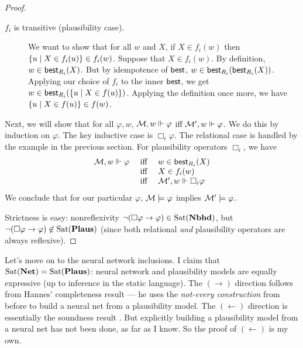 \documentclass[letterpaper]{article}
\begin{document}
\begin{proof}
\begin{description}
        \item[$f_i$ is transitive (plausibility case).]
        We want to show that for all $w$ and $X$, if $X \in f_i(w)$ then $\{ u \mid X \in f_i(u) \} \in f_i(w)$.  Suppose that $X \in f_i(w)$.  By definition, $w \in \mathsf{best}_{R_i}(X)$.  But by idempotence of $\mathsf{best}$, $w \in \mathsf{best}_{R_i}(\mathsf{best}_{R_i}(X))$.  Applying our choice of $f_i$ to the inner $\mathsf{best}$, we get $w \in \mathsf{best}_{R_i}(\{ u \mid X \in f(u) \})$.  Applying the definition once more, we have $\{ u \mid X \in f(u) \} \in f(w)$.

    \end{description}

    Next, we will show that for all $\varphi, w$, $\mathcal{M}, w \Vdash \varphi$ iff $\mathcal{M}', w \Vdash \varphi$.  We do this by induction on $\varphi$.  The key inductive case is $\Box_i \varphi$.  The relational case is handled by the example in the previous section.  For plausibility operators $\Box_i$, we have
    \[
    \begin{array}{lcl}
        \mathcal{M}, w \Vdash \varphi & \mbox{ iff } & w \in \mathsf{best}_{R_i}(X) \\
        & \mbox{ iff } & X \in f_i(w) \\
        & \mbox{ iff } & \mathcal{M}', w \Vdash \Box_i \varphi
    \end{array}
    \]
    We conclude that for our particular $\varphi$, $\mathcal{M} \models \varphi$ implies $\mathcal{M}' \models \varphi$.

    Strictness is easy: nonreflexivity $\neg (\Box \varphi \to \varphi) \in \mathrm{Sat}( \textrm{\textbf{Nbhd}} )$, but $\neg (\Box \varphi \to \varphi) \not \in \mathrm{Sat}( \textrm{\textbf{Plaus}} )$ (since both relational \emph{and} plausibility operators are always reflexive).
\end{proof}

Let's move on to the neural network inclusions.  I claim that $\mathrm{Sat}( \textrm{\textbf{Net}} ) = \mathrm{Sat}( \textrm{\textbf{Plaus}} )$: neural network and plausibility models are equally expressive (up to inference in the static language).  The $(\to)$ direction follows from Hannes' completeness result \cite{leitgeb2001nonmonotonic, leitgeb2003nonmonotonic} --- he uses the \emph{not-every construction} from before to build a neural net from a plausibility model.  The $(\leftarrow)$ direction is essentially the soundness result \cite{leitgeb2001nonmonotonic, leitgeb2003nonmonotonic}. But explicitly building a plausibility model from a neural net has not been done, as far as I know.  So the proof of $(\leftarrow)$ is my own.
\end{document}
